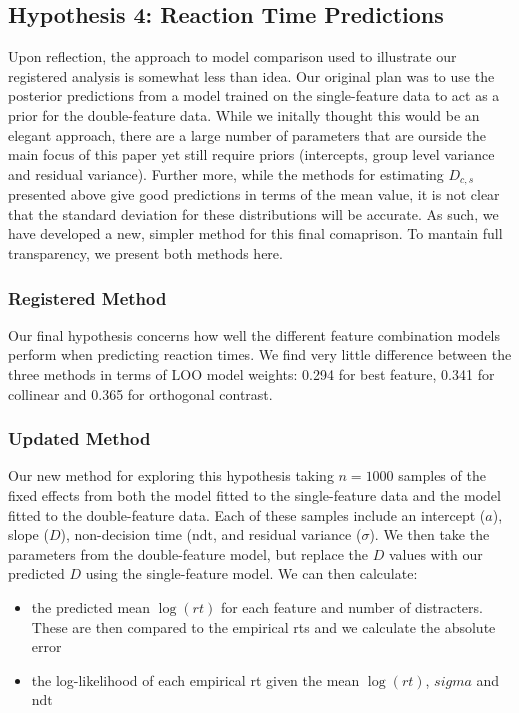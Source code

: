 \documentclass[preprint,12pt,authoryear]{elsarticle}
\begin{document}
\subsection{Hypothesis 4: Reaction Time Predictions}

Upon reflection, the approach to model comparison used to illustrate our registered analysis is somewhat less than idea. Our original plan was to use the posterior predictions from a model trained on the single-feature data to act as a prior for the double-feature data. While we initally thought this would be an elegant approach, there are a large number of parameters that are ourside the main focus of this paper yet still require priors (intercepts, group level variance and residual variance). Further more, while the methods for estimating $D_{c,s}$ presented above give good predictions in terms of the mean value, it is not clear that the standard deviation for these distributions will be accurate. As such, we have developed a new, simpler method for this final comaprison. To mantain full transparency, we present both methods here. 

\subsubsection{Registered Method}

Our final hypothesis concerns how well the different feature combination models perform when predicting reaction times. We find very little difference between the three methods in terms of LOO model weights: 0.294 for best feature, 0.341 for collinear and 0.365 for orthogonal contrast. 

\subsubsection{Updated Method}

Our new method for exploring this hypothesis taking $n=1000$ samples of the fixed effects from both the model fitted to the single-feature data and the model fitted to the double-feature data. Each of these samples include an intercept ($a$), slope ($D$), non-decision time ($\text{ndt}$, and residual variance ($\sigma$). We then take the parameters from the double-feature model, but replace the $D$ values with our predicted $D$ using the single-feature model. We can then calculate:

\begin{itemize}
    \item the predicted mean $\log(rt)$ for each feature and number of distracters. These are then compared to the empirical rts and we calculate the absolute error
    \item the log-likelihood of each empirical rt given the mean $\log(rt)$, $sigma$ and $\text{ndt}$
\end{itemize}
\end{document}
